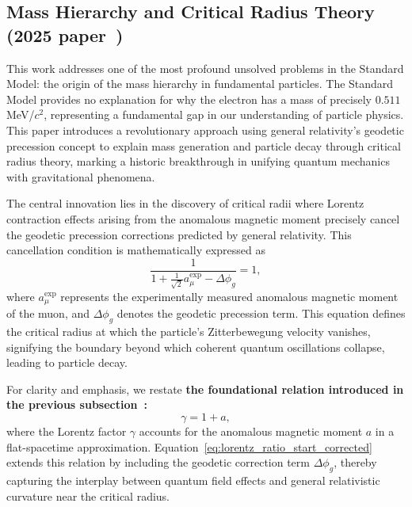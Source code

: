 \documentclass[%
 reprint,
 amsmath,amssymb,
 aps,
]{revtex4-1}
\numberwithin{equation}{section}%
\begin{document}
\subsection{Mass Hierarchy and Critical Radius Theory (2025 paper~\cite{hanamura2501.0130})}

This work addresses one of the most profound unsolved problems in the Standard Model: the origin of the mass hierarchy in fundamental particles. The Standard Model provides no explanation for why the electron has a mass of precisely $0.511$ MeV/$c^{2}$, representing a fundamental gap in our understanding of particle physics. This paper introduces a revolutionary approach using general relativity's geodetic precession concept to explain mass generation and particle decay through critical radius theory, marking a historic breakthrough in unifying quantum mechanics with gravitational phenomena.

The central innovation lies in the discovery of critical radii where Lorentz contraction effects arising from the anomalous magnetic moment precisely cancel the geodetic precession corrections predicted by general relativity. This cancellation condition is mathematically expressed as
\begin{equation}
   \frac{1}{1 + \frac{1}{\sqrt{2}}a^{\text{exp}}_{\mu} - \Delta\phi_g} = 1,
\label{eq:lorentz_ratio_start_corrected}
\end{equation}
where \( a^{\text{exp}}_{\mu} \) represents the experimentally measured anomalous magnetic moment of the muon, and \( \Delta\phi_g \) denotes the geodetic precession term. This equation defines the critical radius at which the particle’s Zitterbewegung velocity vanishes, signifying the boundary beyond which coherent quantum oscillations collapse, leading to particle decay.

For clarity and emphasis, we restate \textbf{the foundational relation introduced in the previous subsection~\cite{hanamura2504.0115}:}
\begin{equation}
\gamma = 1 + a,
\label{eq:gamma_anomaly_relation}
\end{equation}
where the Lorentz factor \( \gamma \) accounts for the anomalous magnetic moment \( a \) in a flat-spacetime approximation. Equation~\eqref{eq:lorentz_ratio_start_corrected} extends this relation by including the geodetic correction term \( \Delta\phi_g \), thereby capturing the interplay between quantum field effects and general relativistic curvature near the critical radius.
\end{document}
